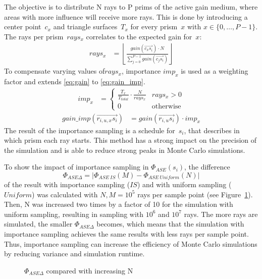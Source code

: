 The objective is to distribute N rays to P prims of the active gain medium, 
where areas with more influence will receive more rays.
This is done by introducing a center point~$c_x$ and triangle surfaces~$T_x$ for
every prism~$x$ with $x \in \{0,\dots,P-1\}$.
The rays per prism~$rays_x$ correlates to the expected gain for~$x$:
\begin{align}
  rays_x       &= \left\lfloor\frac{gain(\overrightarrow{c_xs_i}) \cdot N}{\sum^{P-1}_{j=0} gain(\overrightarrow{c_js_i})}\right\rfloor
\end{align}
To compensate varying values of$rays_x$, importance $imp_x$ is used as a weighting factor
and extends \eqref{eq:gain} to \eqref{eq:gain_imp}.
\begin{align}
imp_x &= 
\begin{cases}
\frac{T_x}{T_{total}} \cdot \frac{N}{rays_x} &rays_x > 0\\
0 &\text{otherwise}
\end{cases}
\end{align}
\begin{align}
\label{eq:gain_imp}
gain\_imp(\overrightarrow{r_{i,u,x}s_i})        &= gain(\overrightarrow{r_{i,u}s_i}) \cdot imp_x
\end{align}
The result of the importance sampling is a schedule for~$s_i$, that
describes in which prism each ray starts.
This method has a strong impact on the precision of the simulation
and is able to reduce strong peaks in Monte Carlo simulations.

To show the impact of importance sampling in $\Phi_{ASE}(s_i)$, the difference
\[\Phi_{ASE\Delta} = |\Phi_{ASE~IS}(M) - \Phi_{ASE~Uniform}(N)|\] of the 
result with importance sampling ($IS$) and with uniform sampling ($Uniform$) was calculated with 
$N,M = 10^5$ rays per sample point (see Figure~\ref{graphic:importance}). 
Then, N was increased two times by a factor of 10 for the simulation with uniform sampling, resulting in sampling with $10^6$ and $10^7$ rays.
The more rays are simulated, the smaller $\Phi_{ASE\Delta}$ becomes, which 
means that the simulation
with importance sampling achieves the same results with less
rays per sample point. Thus, importance sampling can increase the
efficiency of Monte Carlo simulations by reducing variance 
and simulation runtime. 
\begin{figure}[H]
  \centerline
  {}
  \caption{$\Phi_{ASE\Delta}$ compared with increasing N}
  \label{graphic:importance}
\end{figure}

